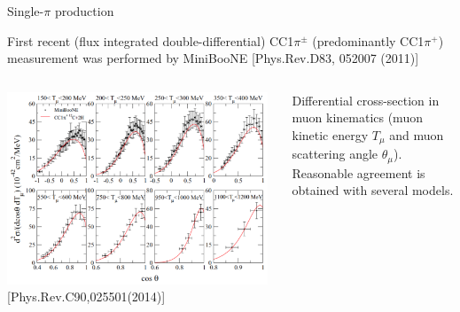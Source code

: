 %
%
%
\begin{frame}{Single-$\pi$ production}

{\scriptsize
  First recent (flux integrated double-differential) CC1$\pi^{\pm}$
  (predominantly CC1$\pi^{+}$) measurement was performed by MiniBooNE
  [Phys.Rev.D83, 052007 (2011)]
}

  \begin{columns}
    \begin{column}{0.62\textwidth}
      \begin{center}
         \includegraphics[width=0.98\textwidth]{./images/nuint/ccpi/mb_cc1pip.png}\\
         {\scriptsize [Phys.Rev.C90,025501(2014)]}
      \end{center}
    \end{column}
    \begin{column}{0.38\textwidth}
     {\scriptsize
      Differential cross-section in muon kinematics
      (muon kinetic energy $T_{\mu}$ and muon scattering angle $\theta_{\mu}$).\\
      \vspace{0.3cm}
      Reasonable agreement is obtained with several models.\\
     }
    \end{column}
  \end{columns}

\end{frame}

